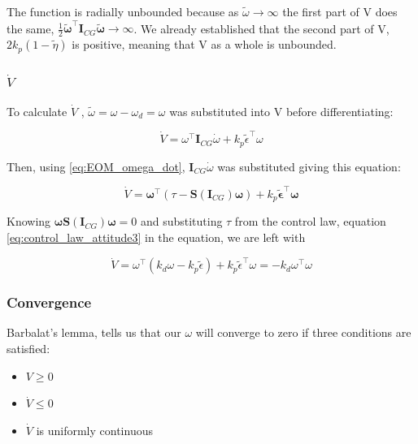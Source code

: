 The function is radially unbounded because as $\tilde{\omega}\rightarrow \infty$ the first part of V does the same, $\frac{1}{2} \tilde{\boldsymbol{\omega}}^{\top} \mathbf{I}_{CG}\tilde{\boldsymbol{\omega}} \rightarrow \infty$. We already established that the second part of V, $2 k_p (1-\tilde{\eta})$ is positive, meaning that V as a whole is unbounded.

\subsubsection*{$\dot{V}$ }

To calculate $\dot{V}$ , $\tilde{\omega} = \omega - \omega_d = \omega$ was substituted into V before differentiating:

\begin{equation}
    \dot{V} = \omega^\top\mathbf{I}_{CG}\dot{\omega} + k_p\tilde{\epsilon}^\top\omega 
\end{equation}

Then, using \eqref{eq:EOM_omega_dot}, $\mathbf{I}_{CG}\dot{\omega}$ was substituted giving this equation:

\begin{equation}
    \dot{V} = \boldsymbol{\omega}^\top(\tau - \mathbf{S}(\mathbf{I}_{CG})\boldsymbol{\omega}) + k_p\tilde{\boldsymbol{\epsilon}}^\top \boldsymbol{\omega }
\end{equation}

Knowing $\boldsymbol{\omega}\mathbf{S}(\mathbf{I}_{CG})\boldsymbol{\omega} = 0$ and substituting $\tau$ from the control law, equation \eqref{eq:control_law_attitude3} in the equation, we are left with

\begin{equation}
    \dot{V} = \omega^\top( k_d \omega - k_p\tilde{\epsilon}) + k_p\tilde{\epsilon}^\top\omega = -k_d\omega^\top\omega
\end{equation}


\subsubsection*{Convergence}

Barbalat's lemma, tells us that our $\omega$ will converge to zero if three conditions are satisfied: 

\begin{itemize}
    \item $V \geq 0$
    \item $\dot{V} \leq 0$
    \item $\dot{V}$ is uniformly continuous
\end{itemize}

